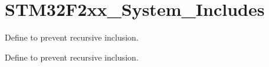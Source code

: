 \hypertarget{group___s_t_m32_f2xx___system___includes}{\section{S\-T\-M32\-F2xx\-\_\-\-System\-\_\-\-Includes}
\label{group___s_t_m32_f2xx___system___includes}
}


Define to prevent recursive inclusion.  


Define to prevent recursive inclusion. 